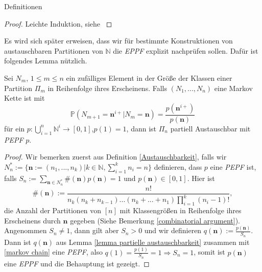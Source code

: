 \begin{section}{Definitionen}
\begin{lemma}
\begin{center}
\end{center}
\end{lemma}
\begin{proof}
    Leichte Induktion, siehe \cite[Proposition 10]{pitman1995exchangeable}
\end{proof}
\begin{Bemerkung}
    Es wird sich später erweisen, dass wir für bestimmte Konstruktionen von austauschbaren Partitionen von $\mathbb{N}$ die \textit{EPPF} explizit nachprüfen sollen. Dafür ist folgendes Lemma nützlich.
\end{Bemerkung}
\begin{lemma}
    \label{Austauschbar Lemma}
    Sei $N_m$, $1 \leq m \leq n$ ein zufälliges Element in der Größe der Klassen einer Partition $\Pi_m$ in Reihenfolge ihres Erscheinens. Falls $(N_1,...,N_n)$ eine Markov Kette ist mit 
    \begin{equation}
    \label{markov chain}
    \mathbb{P}(N_{m+1} = \textbf{n}^{i+} | N_{m} = \textbf{n}) = \frac{p(\textbf{n}^{i+})}{p(\textbf{n})} 
    \end{equation}
   für ein $p: \bigcup_{i = 1}^{n}\mathbb{N}^i \rightarrow [0,1]$,$p(1) = 1$, dann ist $\Pi_n$ partiell Austauschbar mit \textit{PEPF} $p$.
\end{lemma}
\begin{proof}
    Wir bemerken zuerst aus Definition \ref{Austauschbarkeit}, falls wir $N^*_n:= \{\textbf{n}:= (n_1,...,n_k)|k \in \mathbb{N},\sum_{i=1}^{k}n_i = n\}$ definieren, dass $p$ eine \textit{PEPF} ist, falls $S_n := \sum_{\textbf{n} \in N^*_n}\#(\textbf{n})p(\textbf{n}) = 1$ und $p(\textbf{n}) \in [0,1]$. Hier ist 
    \begin{equation}
        \label{combinatorial equation}
        \#(\textbf{n}):= \frac{n!}{n_k(n_k + n_{k-1})...(n_k+...+n_1)\prod_{i=1}^{k}(n_i-1)!},
    \end{equation}
    die Anzahl der Partitionen von $[n]$ mit Klassengrößen in Reihenfolge ihres Erscheinens durch $\textbf{n}$ gegeben (Siehe Bemerkung \ref{combinatorial argument}). Angenommen $S_n \neq 1$, dann gilt aber $S_n> 0$ und wir definieren $q(\textbf{n}) := \frac{p(\textbf{n})}{S_n}$. Dann ist $q(\textbf{n})$ aus Lemma \ref{lemma partielle austauschbarkeit} zusammen mit \ref{markov chain} eine \textit{PEPF}, also $q(1) = \frac{p(1)}{S_n} = 1 \Rightarrow S_n =1$, somit ist $p(\textbf{n})$ eine \textit{EPPF} und die Behauptung ist gezeigt. 
\end{proof}
\begin{Bemerkung}
    \label{combinatorial argument}

\end{Bemerkung}
\end{section}
